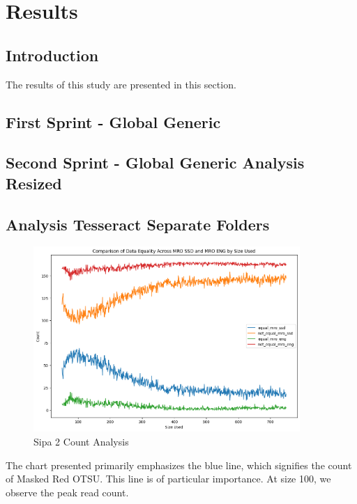 \chapter{Results}
\label{chap:results}

\section{Introduction}

The results of this study are presented in this section.

\section{First Sprint - Global Generic}
\section{Second Sprint - Global Generic Analysis Resized}

\newpage

\section{Analysis Tesseract Separate Folders}


\begin{figure}[ht]
    \centering
    \includegraphics[width=0.9\textwidth]{Figures/Results/sipa_02/count_analysis.png}
    \caption[Count Analysis]{Sipa 2 Count Analysis}
    \label{fig:Sipa 2 Count Analysis}
\end{figure}

The chart presented primarily emphasizes the blue line, which signifies the count of Masked Red OTSU. This line is of particular importance. At size 100, we observe the peak read count.

